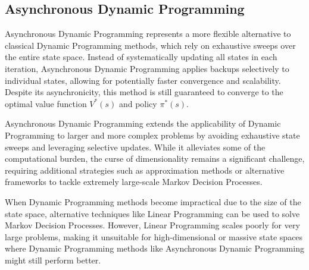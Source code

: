 \subsection{Asynchronous Dynamic Programming}
Asynchronous Dynamic Programming  represents a more flexible alternative to classical Dynamic Programming methods, which rely on exhaustive sweeps over the entire state space.
Instead of systematically updating all states in each iteration, Asynchronous Dynamic Programming applies backups selectively to individual states, allowing for potentially faster convergence and scalability.
Despite its asynchronicity, this method is still guaranteed to converge to the optimal value function $V^\ast(s)$ and policy $\pi^\ast(s)$. 

Asynchronous Dynamic Programming extends the applicability of Dynamic Programming to larger and more complex problems by avoiding exhaustive state sweeps and leveraging selective updates. 
While it alleviates some of the computational burden, the curse of dimensionality remains a significant challenge, requiring additional strategies such as approximation methods or alternative frameworks to tackle extremely large-scale Markov Decision Processes.

When Dynamic Programming methods become impractical due to the size of the state space, alternative techniques like Linear Programming can be used to solve Markov Decision Processes. 
However, Linear Programming scales poorly for very large problems, making it unsuitable for high-dimensional or massive state spaces where Dynamic Programming methods like Asynchronous Dynamic Programming might still perform better.